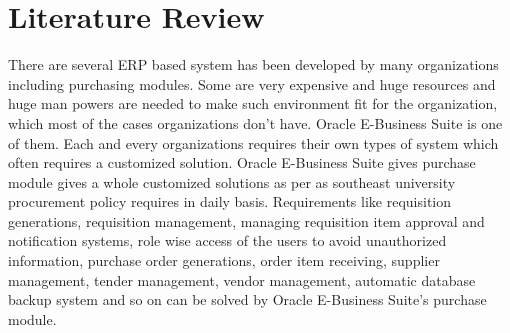 \documentclass[12pt]{report} %
\begin{document}
\chapter{Literature Review}
\setcounter{page}{1}
\thispagestyle{empty}    %

There are several ERP based system has been developed by many organizations including purchasing modules. Some are very expensive and huge resources and huge man powers are needed to make such environment fit for the organization, which most of the cases organizations don't have. Oracle E-Business Suite is one of them. Each and every organizations requires their own types of system which often requires a customized solution. Oracle E-Business Suite gives purchase module gives a whole customized solutions as per as southeast university procurement policy requires in daily basis. Requirements like requisition generations, requisition management, managing requisition item approval and notification systems, role wise access of the users to avoid unauthorized information, purchase order generations, order item receiving, supplier management, tender management, vendor management, automatic database backup system and so on can be solved by Oracle E-Business Suite's purchase module.\cite{purchase_module_book} \label{sec:purchase_module_book_1}\\


\end{document}
